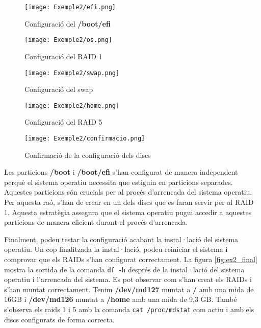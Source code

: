 \begin{figure}[!htb]
        \centering
        \texttt{[image: Exemple2/efi.png]}
        \caption{Configuració del \textbf{/boot/efi}}
        \label{fig:ex2_efi}
\end{figure}

\begin{figure}[!htb]
        \centering
        \texttt{[image: Exemple2/os.png]}
        \caption{Configuració del RAID 1}
        \label{fig:ex2_os}
\end{figure}


\begin{figure}[!htb]
        \centering
        \texttt{[image: Exemple2/swap.png]}
        \caption{Configuració del swap}
        \label{fig:ex2_swap}
\end{figure}

\begin{figure}[!htb]
        \centering
        \texttt{[image: Exemple2/home.png]}
        \caption{Configuració del RAID 5}
        \label{fig:ex2_home}
\end{figure}

\begin{figure}[!htb]
        \centering
        \texttt{[image: Exemple2/confirmacio.png]}
        \caption{Confirmació de la configuració dels discs}
        \label{fig:ex2_confirmacio}
\end{figure}

\begin{warning}
Les particions \textbf{/boot} i \textbf{/boot/efi} s'han configurat de manera independent perquè el sistema operatiu necessita que estiguin en particions separades. Aquestes particions són crucials per al procés d'arrencada del sistema operatiu. Per aquesta raó, s'han de crear en un dels discs que es faran servir per al RAID 1. Aquesta estratègia assegura que el sistema operatiu pugui accedir a aquestes particions de manera eficient durant el procés d'arrencada.
\end{warning}

Finalment, podeu testar la configuració acabant la instal·lació del sistema operatiu. Un cop finalitzada la instal·lació, podeu reiniciar el sistema i comprovar que els RAIDs s'han configurat correctament. La figura \ref{fig:ex2_final} mostra la sortida de la comanda \texttt{df -h} després de la instal·lació del sistema operatiu i l'arrencada del sistema. Es pot observar com s'han creat els RAIDs i s'han muntat correctament. Tenim \textbf{/dev/md127} muntat a \textbf{/} amb una mida de 16GB i \textbf{/dev/md126} muntat a \textbf{/home} amb una mida de 9,3 GB. També s'observa els raids 1 i 5 amb la comanda \texttt{cat /proc/mdstat} com actiu i amb els discs configurats de forma correcta.

